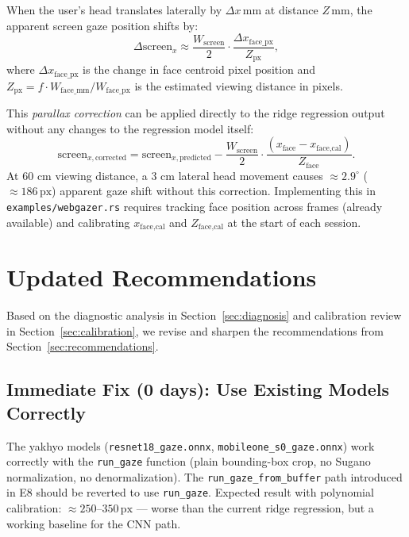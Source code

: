 \documentclass[11pt,a4paper]{article}
\begin{document}
When the user's head translates laterally by $\Delta x\,\text{mm}$ at distance $Z\,\text{mm}$, the apparent screen gaze position shifts by:
\begin{equation}
  \Delta\text{screen}_x \approx \frac{W_{\text{screen}}}{2} \cdot \frac{\Delta x_{\text{face\_px}}}{Z_{\text{px}}},
\end{equation}
where $\Delta x_{\text{face\_px}}$ is the change in face centroid pixel position and $Z_{\text{px}} = f \cdot W_{\text{face\_mm}} / W_{\text{face\_px}}$ is the estimated viewing distance in pixels.

This \textit{parallax correction} can be applied directly to the ridge regression output without any changes to the regression model itself:
\begin{equation}
  \text{screen}_{x,\text{corrected}} = \text{screen}_{x,\text{predicted}} - \frac{W_{\text{screen}}}{2} \cdot \frac{(x_{\text{face}} - x_{\text{face,cal}})}{Z_{\text{face}}}.
\end{equation}
At 60 cm viewing distance, a 3 cm lateral head movement causes $\approx2.9^\circ$ ($\approx186\,\text{px}$) apparent gaze shift without this correction.
Implementing this in \texttt{examples/webgazer.rs} requires tracking face position across frames (already available) and calibrating $x_{\text{face,cal}}$ and $Z_{\text{face,cal}}$ at the start of each session.

\section{Updated Recommendations}
\label{sec:updated_rec}

Based on the diagnostic analysis in Section~\ref{sec:diagnosis} and calibration review in Section~\ref{sec:calibration}, we revise and sharpen the recommendations from Section~\ref{sec:recommendations}.

\subsection{Immediate Fix (0 days): Use Existing Models Correctly}

The yakhyo models (\texttt{resnet18\_gaze.onnx}, \texttt{mobileone\_s0\_gaze.onnx}) work correctly with the \texttt{run\_gaze} function (plain bounding-box crop, no Sugano normalization, no denormalization).
The \texttt{run\_gaze\_from\_buffer} path introduced in E8 should be reverted to use \texttt{run\_gaze}.
Expected result with polynomial calibration: $\approx250$--$350\,\text{px}$ --- worse than the current ridge regression, but a working baseline for the CNN path.
\end{document}
